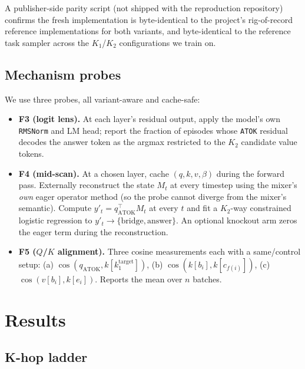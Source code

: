\documentclass[11pt]{article}
\begin{document}
A publisher-side parity script (not shipped with the reproduction
repository) confirms the fresh implementation is byte-identical to the
project's rig-of-record reference implementations for both variants,
and byte-identical to the reference task sampler across the $K_1$/$K_2$
configurations we train on.

\subsection{Mechanism probes}
\label{sec:setup:probes}

We use three probes, all variant-aware and cache-safe:

\begin{itemize}
\item \textbf{F3 (logit lens).} At each layer's residual output, apply
      the model's own \texttt{RMSNorm} and LM head; report the fraction
      of episodes whose \texttt{ATOK} residual decodes the answer token
      as the argmax restricted to the $K_2$ candidate value tokens.
\item \textbf{F4 (mid-scan).} At a chosen layer, cache
      $(q, k, v, \beta)$ during the forward pass. Externally
      reconstruct the state $M_t$ at every timestep using the mixer's
      \emph{own} eager operator method (so the probe cannot diverge from
      the mixer's semantic). Compute
      $y'_t = q_{\text{ATOK}}^{\top} M_t$ at every $t$ and fit a
      $K_2$-way constrained logistic regression to
      $y'_t \to \{\text{bridge},\text{answer}\}$. An optional knockout
      arm zeros the eager term during the reconstruction.
\item \textbf{F5 ($Q$/$K$ alignment).} Three cosine measurements each
      with a same/control setup: (a) $\cos(q_{\text{ATOK}},
      k[k_1^{\text{target}}])$, (b) $\cos(k[b_i], k[c_{f(i)}])$,
      (c) $\cos(v[b_i], k[e_i])$. Reports the mean over $n$ batches.
\end{itemize}

\section{Results}
\label{sec:results}

\subsection{K-hop ladder}
\label{sec:results:ladder}
\end{document}
